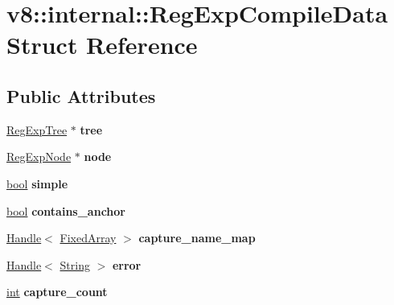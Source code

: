 \hypertarget{structv8_1_1internal_1_1RegExpCompileData}{}\section{v8\+:\+:internal\+:\+:Reg\+Exp\+Compile\+Data Struct Reference}
\label{structv8_1_1internal_1_1RegExpCompileData}
\subsection*{Public Attributes}
\begin{DoxyCompactItemize}
\item 
\mbox{\label{structv8_1_1internal_1_1RegExpCompileData_a3708590201a9779d3673351f2f00f5b5}} 
\mbox{\hyperlink{classv8_1_1internal_1_1RegExpTree}{Reg\+Exp\+Tree}} $\ast$ {\bfseries tree}
\item 
\mbox{\label{structv8_1_1internal_1_1RegExpCompileData_a5c7d6ebed31abb05a2e5c36b9845401a}} 
\mbox{\hyperlink{classv8_1_1internal_1_1RegExpNode}{Reg\+Exp\+Node}} $\ast$ {\bfseries node}
\item 
\mbox{\label{structv8_1_1internal_1_1RegExpCompileData_a5aa50533560892ee932515808bd70093}} 
\mbox{\hyperlink{classbool}{bool}} {\bfseries simple}
\item 
\mbox{\label{structv8_1_1internal_1_1RegExpCompileData_a25f107ad7d0816bc0a970cae153d2bb6}} 
\mbox{\hyperlink{classbool}{bool}} {\bfseries contains\+\_\+anchor}
\item 
\mbox{\label{structv8_1_1internal_1_1RegExpCompileData_a1cbc2c3af557725728181b29f7468dc3}} 
\mbox{\hyperlink{classv8_1_1internal_1_1Handle}{Handle}}$<$ \mbox{\hyperlink{classv8_1_1internal_1_1FixedArray}{Fixed\+Array}} $>$ {\bfseries capture\+\_\+name\+\_\+map}
\item 
\mbox{\label{structv8_1_1internal_1_1RegExpCompileData_a8a47f8e4d306fce7d1b8596414248760}} 
\mbox{\hyperlink{classv8_1_1internal_1_1Handle}{Handle}}$<$ \mbox{\hyperlink{classv8_1_1internal_1_1String}{String}} $>$ {\bfseries error}
\item 
\mbox{\label{structv8_1_1internal_1_1RegExpCompileData_a1e24fe15bae48fc5fa0bd565dadca421}} 
\mbox{\hyperlink{classint}{int}} {\bfseries capture\+\_\+count}
\end{DoxyCompactItemize}


